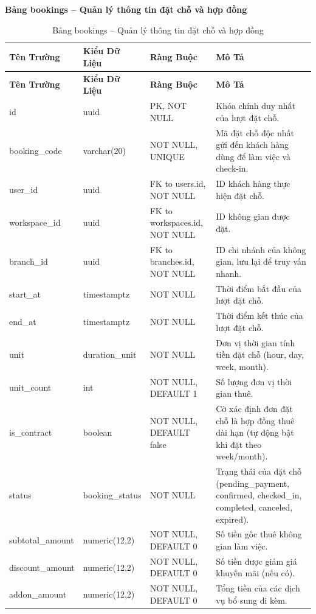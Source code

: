 \textbf{Bảng bookings -- Quản lý thông tin đặt chỗ và hợp đồng}
\label{table:bookings}
\begin{longtable}{|p{3cm}|p{2.5cm}|p{3.5cm}|p{5cm}|}
\caption{Bảng bookings -- Quản lý thông tin đặt chỗ và hợp đồng} \\
\hline
\textbf{Tên Trường} & \textbf{Kiểu Dữ Liệu} & \textbf{Ràng Buộc} & \textbf{Mô Tả} \\
\hline
\endfirsthead
\hline
\textbf{Tên Trường} & \textbf{Kiểu Dữ Liệu} & \textbf{Ràng Buộc} & \textbf{Mô Tả} \\
\hline
\endhead
id & uuid & PK, NOT NULL & Khóa chính duy nhất của lượt đặt chỗ. \\
\hline
booking\_code & varchar(20) & NOT NULL, UNIQUE & Mã đặt chỗ độc nhất gửi đến khách hàng dùng để làm việc và check-in. \\
\hline
user\_id & uuid & FK to users.id, NOT NULL & ID khách hàng thực hiện đặt chỗ. \\
\hline
workspace\_id & uuid & FK to workspaces.id, NOT NULL & ID không gian được đặt. \\
\hline
branch\_id & uuid & FK to branches.id, NOT NULL & ID chi nhánh của không gian, lưu lại để truy vấn nhanh. \\
\hline
start\_at & timestamptz & NOT NULL & Thời điểm bắt đầu của lượt đặt chỗ. \\
\hline
end\_at & timestamptz & NOT NULL & Thời điểm kết thúc của lượt đặt chỗ. \\
\hline
unit & duration\_unit & NOT NULL & Đơn vị thời gian tính tiền đặt chỗ (hour, day, week, month). \\
\hline
unit\_count & int & NOT NULL, DEFAULT 1 & Số lượng đơn vị thời gian thuê. \\
\hline
is\_contract & boolean & NOT NULL, DEFAULT false & Cờ xác định đơn đặt chỗ là hợp đồng thuê dài hạn (tự động bật khi đặt theo week/month). \\
\hline
status & booking\_status & NOT NULL & Trạng thái của đặt chỗ (pending\_payment, confirmed, checked\_in, completed, canceled, expired). \\
\hline
subtotal\_amount & numeric(12,2) & NOT NULL, DEFAULT 0 & Số tiền gốc thuê không gian làm việc. \\
\hline
discount\_amount & numeric(12,2) & NOT NULL, DEFAULT 0 & Số tiền được giảm giá khuyến mãi (nếu có). \\
\hline
addon\_amount & numeric(12,2) & NOT NULL, DEFAULT 0 & Tổng tiền của các dịch vụ bổ sung đi kèm. \\

\end{longtable}
